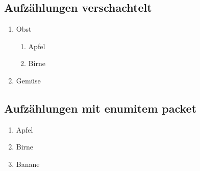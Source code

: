 \subsection{Aufzählungen verschachtelt}
\begin{enumerate}
    \item Obst
          \begin{enumerate}
              \item Apfel
              \item Birne
          \end{enumerate}
    \item Gemüse
\end{enumerate}

\subsection{Aufzählungen mit enumitem packet}
\begin{enumerate}[label=(\alph*)]
    \item Apfel
    \item Birne
    \item Banane
\end{enumerate}

\newpage